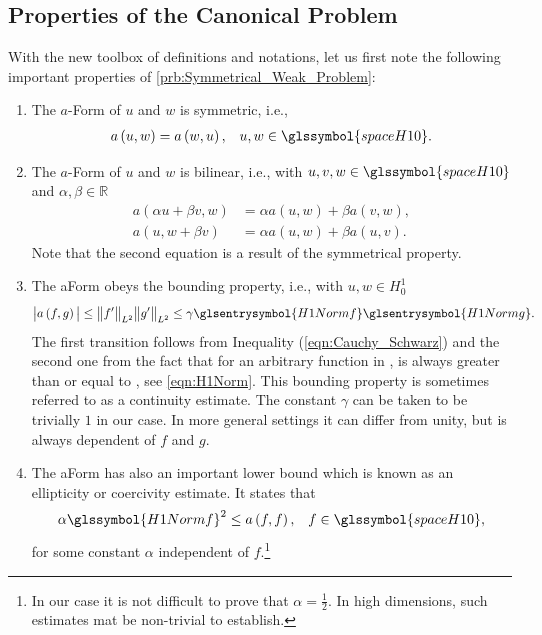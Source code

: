 \subsection{Properties of the Canonical Problem}
With the new toolbox of definitions and notations, let us first note the following important properties of \cref{prb:Symmetrical_Weak_Problem}:
\begin{enumerate}
	
	\item The $a$-Form of $u$ and $w$ is symmetric, i.e.,
	\begin{align}	\label{eqn:Property_Symmetry}
		a \left( u, w \right) &= a \left( w, u \right),	& u, w \in \glssymbol{spaceH10}.
	\end{align}
	
	\item The $a$-Form of $u$ and $w$ is bilinear, i.e., with $u, v, w \in \glssymbol{spaceH10}$ and $\alpha, \beta \in \mathbb{R}$
	\begin{equation}	\label{eqn:Property_Bilinear}		
		\begin{aligned}
			a \left( \alpha u + \beta v, w \right) &= \alpha a \left( u, w \right) + \beta a \left( v, w \right), \\
			a \left( u, w + \beta v \right) &= \alpha a \left( u, w \right) + \beta a \left( u, v \right).
		\end{aligned}
	\end{equation}		
	Note that the second equation is a result of the symmetrical property.
	
	\item The \gls{aForm} obeys the bounding property, i.e., with $u, w \in H_0^1$ 
	\begin{equation}	\label{eqn:Property_Bounding}
		\big \vert a \left( f, g \right) \big \vert \leq \big\| f^\prime \big\|_{ L^2 } \big\| g^\prime \big\|_{ L^2 } \leq
			\gamma \glsentrysymbol{H1Normf} \glsentrysymbol{H1Normg}.
	\end{equation}
	The first transition follows from Inequality (\ref{eqn:Cauchy_Schwarz}) and the second one from the fact that for an arbitrary
	function in ,  is always greater than or equal to ,
	see \cref{eqn:H1Norm}. This bounding property is sometimes referred to as a continuity estimate. The constant $\gamma$ can be
	taken to be trivially $1$ in our case. In more general settings it can differ from unity, but is always dependent of $f$ and $g$.
	
	\item The \gls{aForm} has also an important lower bound which is known as an ellipticity or coercivity estimate. It states that
	\begin{align}	\label{eqn:Property_Elipticity}
		\alpha \glssymbol{H1Normf}^2 &\leq a \left( f, f \right),	& f \in \glssymbol{spaceH10},
	\end{align}
	for some constant $\alpha$ independent of $f$.\footnote{In our case it is not difficult to prove that $\alpha = \frac{1}{2}$.
	In high dimensions, such estimates mat be non-trivial to establish.} 
	

\end{enumerate}
